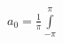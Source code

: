 \documentclass[preview]{standalone}
\begin{document}
\begin{center}
$\displaystyle{a_0=\frac{1}{\pi}\int\limits_{-\pi}^{\pi}}$
\end{center}
\end{document}
